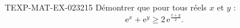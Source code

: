 \begin{exercice}{TEXP-MAT-EX-023}{2}{15}
Démontrer que pour tous réels $x$ et $y$ :
\[ \mathrm{e}^x + \mathrm{e}^y \geq 2\,\mathrm{e}^{\frac{x+y}{2}}. \]

\end{exercice}
